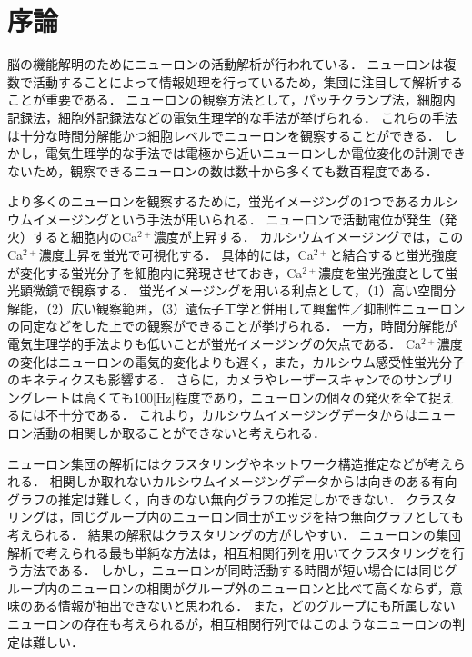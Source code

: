 \chapter{序論}
% 
% 
脳の機能解明のためにニューロンの活動解析が行われている．
ニューロンは複数で活動することによって情報処理を行っているため，集団に注目して解析することが重要である．
ニューロンの観察方法として，パッチクランプ法，細胞内記録法，細胞外記録法などの電気生理学的な手法が挙げられる．
これらの手法は十分な時間分解能かつ細胞レベルでニューロンを観察することができる．
しかし，電気生理学的な手法では電極から近いニューロンしか電位変化の計測できないため，観察できるニューロンの数は数十から多くても数百程度である．

より多くのニューロンを観察するために，蛍光イメージングの1つであるカルシウムイメージングという手法が用いられる．
ニューロンで活動電位が発生（発火）すると細胞内のCa${}^{2+}$濃度が上昇する．
カルシウムイメージングでは，このCa${}^{2+}$濃度上昇を蛍光で可視化する．
具体的には，Ca${}^{2+}$と結合すると蛍光強度が変化する蛍光分子を細胞内に発現させておき，Ca${}^{2+}$濃度を蛍光強度として蛍光顕微鏡で観察する．
蛍光イメージングを用いる利点として，（1）高い空間分解能，（2）広い観察範囲，（3）遺伝子工学と併用して興奮性／抑制性ニューロンの同定などをした上での観察ができることが挙げられる．
一方，時間分解能が電気生理学的手法よりも低いことが蛍光イメージングの欠点である．
Ca${}^{2+}$濃度の変化はニューロンの電気的変化よりも遅く，また，カルシウム感受性蛍光分子のキネティクスも影響する．
さらに，カメラやレーザースキャンでのサンプリングレートは高くても100[Hz]程度であり，ニューロンの個々の発火を全て捉えるには不十分である．
これより，カルシウムイメージングデータからはニューロン活動の相関しか取ることができないと考えられる．

ニューロン集団の解析にはクラスタリングやネットワーク構造推定などが考えられる．
相関しか取れないカルシウムイメージングデータからは向きのある有向グラフの推定は難しく，向きのない無向グラフの推定しかできない．
クラスタリングは，同じグループ内のニューロン同士がエッジを持つ無向グラフとしても考えられる．
結果の解釈はクラスタリングの方がしやすい．
ニューロンの集団解析で考えられる最も単純な方法は，相互相関行列を用いてクラスタリングを行う方法である．
しかし，ニューロンが同時活動する時間が短い場合には同じグループ内のニューロンの相関がグループ外のニューロンと比べて高くならず，意味のある情報が抽出できないと思われる．
また，どのグループにも所属しないニューロンの存在も考えられるが，相互相関行列ではこのようなニューロンの判定は難しい．

